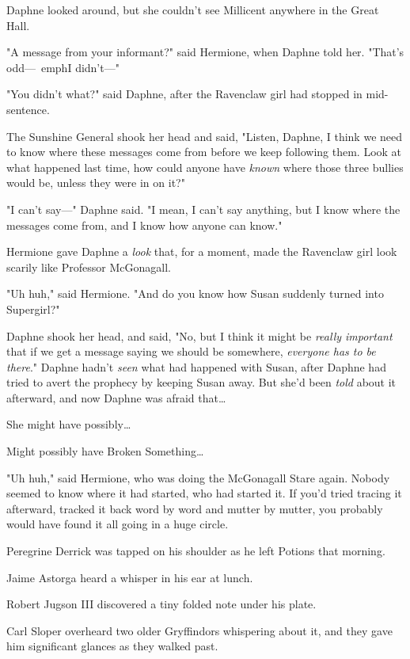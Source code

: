 Daphne looked around, but she couldn't see Millicent anywhere in the Great Hall.

"A message from your informant?" said Hermione, when Daphne told her. "That's 
odd---\ emph{I} didn't---"

"You didn't what?" said Daphne, after the Ravenclaw girl had stopped in 
mid-sentence.

The Sunshine General shook her head and said, "Listen, Daphne, I think we need 
to know where these messages come from before we keep following them. Look at 
what happened last time, how could anyone have \emph{known} where those three 
bullies would be, unless they were in on it?"

"I can't say---" Daphne said. "I mean, I can't say anything, but I know where 
the messages come from, and I know how anyone can know."

Hermione gave Daphne a \emph{look} that, for a moment, made the Ravenclaw girl 
look scarily like Professor McGonagall.

"Uh huh," said Hermione. "And do you know how Susan suddenly turned into 
Supergirl?"

Daphne shook her head, and said, "No, but I think it might be \emph{really 
important} that if we get a message saying we should be somewhere, 
\emph{everyone has to be there}." Daphne hadn't \emph{seen} what had happened 
with Susan, after Daphne had tried to avert the prophecy by keeping Susan away. 
But she'd been \emph{told} about it afterward, and now Daphne was afraid 
that{\ldots}

She might have possibly{\ldots}

Might possibly have Broken Something{\ldots}

"Uh huh," said Hermione, who was doing the McGonagall Stare again.
\sbreak
Nobody seemed to know where it had started, who had started it. If you'd tried 
tracing it afterward, tracked it back word by word and mutter by mutter, you 
probably would have found it all going in a huge circle.

Peregrine Derrick was tapped on his shoulder as he left Potions that morning.

Jaime Astorga heard a whisper in his ear at lunch.

Robert Jugson III discovered a tiny folded note under his plate.

Carl Sloper overheard two older Gryffindors whispering about it, and they gave 
him significant glances as they walked past.

